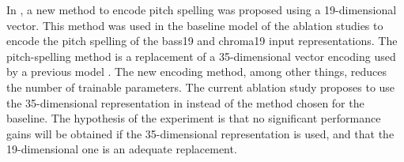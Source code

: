 
In , a new method to encode
pitch spelling was proposed using a 19-dimensional vector.
This method was used in the baseline model of the ablation
studies to encode the pitch spelling of the \gls{bass19} and
\gls{chroma19} input representations. The pitch-spelling
method is a replacement of a 35-dimensional vector encoding
used by a previous model \parencite{micchi2021deep}. The new
encoding method, among other things, reduces the number of
trainable parameters. The current ablation study proposes to
use the 35-dimensional representation in
\textcite{micchi2021deep} instead of the method chosen for
the baseline. The hypothesis of the experiment is that no
significant performance gains will be obtained if the
35-dimensional representation is used, and that the
19-dimensional one is an adequate replacement.
